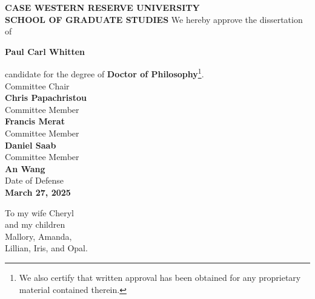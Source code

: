 \documentclass[12pt, oneside]{book}
\begin{document}
\newpage
\begin{center}
    \textbf{\MakeUppercase{Case Western Reserve University}}\\
    \textbf{\MakeUppercase{School of Graduate Studies}}
    \vfill
    We hereby approve the dissertation of \par
    \textbf{Paul Carl Whitten} \par
    candidate for the degree of \textbf{Doctor of Philosophy}\footnote{We also certify that written approval has been obtained for any proprietary material contained therein.}.\\
    \vfill
    Committee Chair \\
    \textbf{Chris Papachristou}\\
    \vfill
    Committee Member \\
    \textbf{Francis Merat}\\
    \vfill
    Committee Member \\
    \textbf{Daniel Saab}\\
    \vfill
    Committee Member \\
    \textbf{An Wang}\\
    \vfill
    Date of Defense \\
    \textbf{March 27, 2025}
\end{center}




\clearpage
\begin{center}
    \thispagestyle{empty}
    \vspace*{\fill}
    To my wife Cheryl\\
    and my children\\
    Mallory, Amanda,\\
    Lillian, Iris, and Opal.
    \vspace*{\fill}
\end{center}
\clearpage


%
\end{document}
